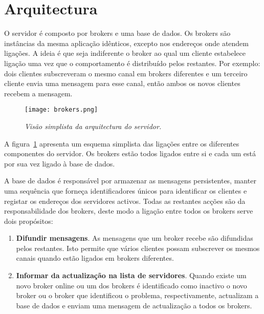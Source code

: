 \section{Arquitectura}
O servidor é composto por brokers e uma base de dados. 
Os brokers são instâncias da mesma aplicação idênticos, excepto nos endereços onde atendem ligações. A ideia é que seja indiferente o broker ao qual um cliente estabelece ligação uma vez que o comportamento é distribuído pelos restantes.
Por exemplo: dois clientes subscreveram o mesmo canal em brokers diferentes e um terceiro cliente envia uma mensagem para esse canal, então ambos os novos clientes recebem a mensagem.

\begin{figure}[H]
\centering
\texttt{[image: brokers.png]}
\caption{\textit{Visão simplista da arquitectura do servidor.}}
\label{fig:brokers-arq}
\end{figure}

A figura~\ref{fig:brokers-arq} apresenta um esquema simplista das ligações entre os diferentes componentes do servidor. Os brokers estão todos ligados entre si e cada um está por sua vez ligado à base de dados.

A base de dados é responsável por armazenar as mensagens persistentes, manter uma sequência que forneça identificadores únicos para identificar os clientes e registar os endereços dos servidores activos. Todas as restantes acções são da responsabilidade dos brokers, deste modo a ligação entre todos os brokers serve dois propósitos:

\begin{enumerate}
\item \textbf{Difundir mensagens}. As mensagens que um broker recebe são difundidas pelos restantes. Isto permite que vários clientes possam subscrever os mesmos canais quando estão ligados em brokers diferentes.
\item \textbf{Informar da actualização na lista de servidores}. Quando existe um novo broker online ou um dos brokers é identificado como inactivo o novo broker ou o broker que identificou o problema, respectivamente, actualizam a base de dados e enviam uma mensagem de actualização a todos os brokers.
\end{enumerate}

